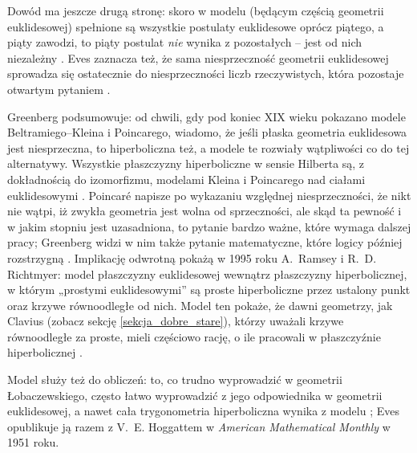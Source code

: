 Dowód ma jeszcze drugą stronę: skoro w modelu (będącym częścią geometrii euklidesowej) spełnione są wszystkie postulaty euklidesowe oprócz piątego, a piąty zawodzi, to piąty postulat \emph{nie} wynika z pozostałych -- jest od nich niezależny \cite[s. 352]{eves1_1972}. %
Eves zaznacza też, że sama niesprzeczność geometrii euklidesowej sprowadza się ostatecznie do niesprzeczności liczb rzeczywistych, która pozostaje otwartym pytaniem \cite[s. 352--353]{eves1_1972}. %

Greenberg \cite[s. 213]{greenberg_2010} podsumowuje: od chwili, gdy pod koniec XIX wieku pokazano modele Beltramiego--Kleina i Poincarego, wiadomo, że jeśli płaska geometria euklidesowa jest niesprzeczna, to hiperboliczna też, a modele te rozwiały wątpliwości co do tej alternatywy. %
Wszystkie płaszczyzny hiperboliczne w sensie Hilberta są, z dokładnością do izomorfizmu, modelami Kleina i Poincarego nad ciałami euklidesowymi \cite[s. 209]{greenberg_2010}. %
Poincaré napisze po wykazaniu względnej niesprzeczności, że nikt nie wątpi, iż zwykła geometria jest wolna od sprzeczności, ale skąd ta pewność i w jakim stopniu jest uzasadniona, to pytanie bardzo ważne, które wymaga dalszej pracy; Greenberg widzi w nim także pytanie matematyczne, które logicy później rozstrzygną \cite[s. 214]{greenberg_2010}. %
Implikację odwrotną pokażą w 1995 roku A.~Ramsey i R.~D. Richtmyer: model płaszczyzny euklidesowej wewnątrz płaszczyzny hiperbolicznej, w którym „prostymi euklidesowymi'' są proste hiperboliczne przez ustalony punkt oraz krzywe równoodległe od nich. %
Model ten pokaże, że dawni geometrzy, jak Clavius (zobacz sekcję \ref{sekcja_dobre_stare}), którzy uważali krzywe równoodległe za proste, mieli częściowo rację, o ile pracowali w płaszczyźnie hiperbolicznej \cite[s. 214]{greenberg_2010}. %
%
%

Model służy też do obliczeń: to, co trudno wyprowadzić w geometrii Łobaczewskiego, często łatwo wyprowadzić z jego odpowiednika w geometrii euklidesowej, a nawet cała trygonometria hiperboliczna wynika z modelu \cite[s. 353 nn.]{eves1_1972}; Eves opublikuje ją razem z V.~E. Hoggattem w \emph{American Mathematical Monthly} w 1951 roku. %
%
%


